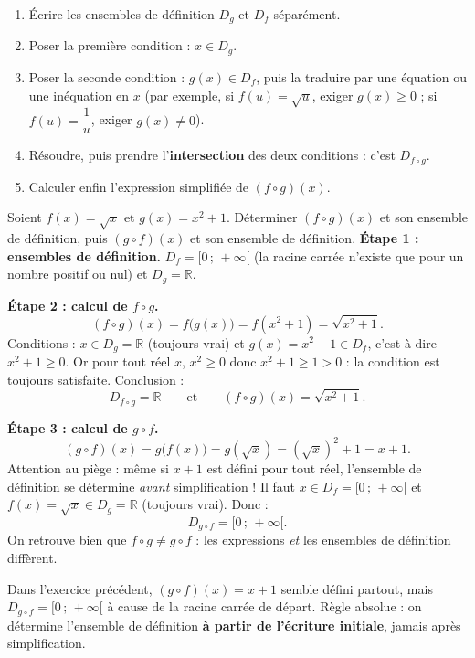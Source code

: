 \documentclass[11pt]{article}
\begin{document}
\begin{methode}
\begin{enumerate}
\item Écrire les ensembles de définition $D_g$ et $D_f$ séparément.
\item Poser la première condition : $x \in D_g$.
\item Poser la seconde condition : $g(x) \in D_f$, puis la traduire par une équation ou une inéquation en $x$ (par exemple, si $f(u) = \sqrt{u}$, exiger $g(x) \geq 0$ ; si $f(u) = \dfrac{1}{u}$, exiger $g(x) \neq 0$).
\item Résoudre, puis prendre l'\textbf{intersection} des deux conditions : c'est $D_{f \circ g}$.
\item Calculer enfin l'expression simplifiée de $(f \circ g)(x)$.
\end{enumerate}
\end{methode}

\begin{exoresolu}
Soient $f(x) = \sqrt{x}$ et $g(x) = x^2 + 1$. Déterminer $(f \circ g)(x)$ et son ensemble de définition, puis $(g \circ f)(x)$ et son ensemble de définition.
\tcblower
\textbf{Étape 1 : ensembles de définition.} $D_f = [0\,;\,+\infty[$ (la racine carrée n'existe que pour un nombre positif ou nul) et $D_g = \mathbb{R}$.

\textbf{Étape 2 : calcul de $f \circ g$.}
\[ (f \circ g)(x) = f\bigl(g(x)\bigr) = f(x^2+1) = \sqrt{x^2+1}. \]
Conditions : $x \in D_g = \mathbb{R}$ (toujours vrai) et $g(x) = x^2 + 1 \in D_f$, c'est-à-dire $x^2 + 1 \geq 0$. Or pour tout réel $x$, $x^2 \geq 0$ donc $x^2 + 1 \geq 1 > 0$ : la condition est toujours satisfaite. Conclusion :
\[ D_{f \circ g} = \mathbb{R} \qquad \text{et} \qquad (f \circ g)(x) = \sqrt{x^2+1}. \]

\textbf{Étape 3 : calcul de $g \circ f$.}
\[ (g \circ f)(x) = g\bigl(f(x)\bigr) = g(\sqrt{x}) = (\sqrt{x})^2 + 1 = x + 1. \]
Attention au piège : même si $x+1$ est défini pour tout réel, l'ensemble de définition se détermine \emph{avant} simplification ! Il faut $x \in D_f = [0\,;\,+\infty[$ et $f(x) = \sqrt{x} \in D_g = \mathbb{R}$ (toujours vrai). Donc :
\[ D_{g \circ f} = [0\,;\,+\infty[. \]
On retrouve bien que $f \circ g \neq g \circ f$ : les expressions \emph{et} les ensembles de définition diffèrent.
\end{exoresolu}

\begin{attention}
Dans l'exercice précédent, $(g \circ f)(x) = x + 1$ semble défini partout, mais $D_{g \circ f} = [0\,;\,+\infty[$ à cause de la racine carrée de départ. Règle absolue : on détermine l'ensemble de définition \textbf{à partir de l'écriture initiale}, jamais après simplification.
\end{attention}
\end{document}

